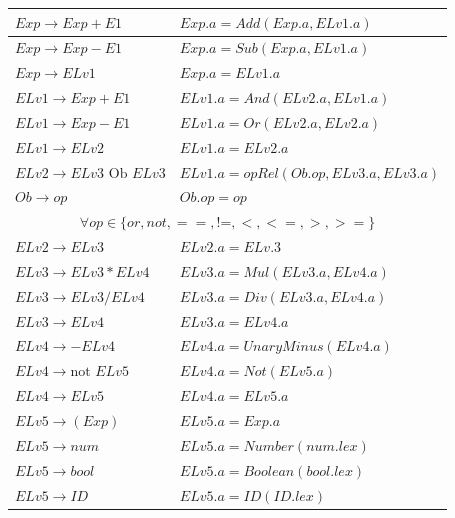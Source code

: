 \documentclass{article}
\begin{document}
\begin{table}[ht!]
\begin{tabular}{|p{4.2cm}|p{7.2cm}|}
		$Exp \rightarrow Exp + E1$ & $Exp.a = Add(Exp.a, ELv1.a)$ \\ \hline
		$Exp \rightarrow Exp - E1$ & $Exp.a = Sub(Exp.a, ELv1.a)$ \\ \hline
		$Exp \rightarrow ELv1$ & $Exp.a = ELv1.a$ \\ \hline
		
		$ELv1 \rightarrow Exp + E1$ & $ELv1.a = And(ELv2.a, ELv1.a)$ \\ \hline
		$ELv1 \rightarrow Exp - E1$ & $ELv1.a = Or(ELv2.a, ELv2.a)$ \\ \hline
		$ELv1 \rightarrow ELv2$ & $ELv1.a = ELv2.a$ \\ \hline
		
		$ELv2 \rightarrow ELv3\text{ Ob } ELv3$ & $ELv1.a = opRel(Ob.op, ELv3.a, ELv3.a)$ \\ \hline
		
		$Ob \rightarrow op$ & $Ob.op = op$ \\ \hline
		
		\multicolumn{2}{|c|}{$\forall op\in\{or, not, ==, \text{!=}, <, <=, >, >=\}$} \\ \hline
		
		$ELv2 \rightarrow ELv3$ & $ELv2.a = ELv.3$ \\ \hline
		
		$ELv3 \rightarrow ELv3 * ELv4$ & $ELv3.a = Mul(ELv3.a, ELv4.a)$ \\ \hline
		$ELv3 \rightarrow ELv3 / ELv4$ & $ELv3.a = Div(ELv3.a, ELv4.a)$ \\ \hline
		
		$ELv3 \rightarrow ELv4$ & $ELv3.a = ELv4.a$ \\ \hline
		
		$ELv4 \rightarrow - ELv4$ & $ELv4.a = UnaryMinus(ELv4.a)$ \\ \hline
		$ELv4 \rightarrow \text{not }ELv5$ & $ELv4.a = Not(ELv5.a)$ \\ \hline
		
		$ELv4 \rightarrow ELv5$ & $ELv4.a = ELv5.a$ \\ \hline
		
		$ELv5 \rightarrow ( Exp )$ & $ELv5.a = Exp.a$ \\ \hline
		$ELv5 \rightarrow num$ & $ELv5.a = Number(num.lex)$ \\ \hline
		$ELv5 \rightarrow bool$ & $ELv5.a = Boolean(bool.lex)$ \\ \hline
		$ELv5 \rightarrow ID$ & $ELv5.a = ID(ID.lex)$ \\ \hline
		
	\end{tabular}
\end{table}
\end{document}
